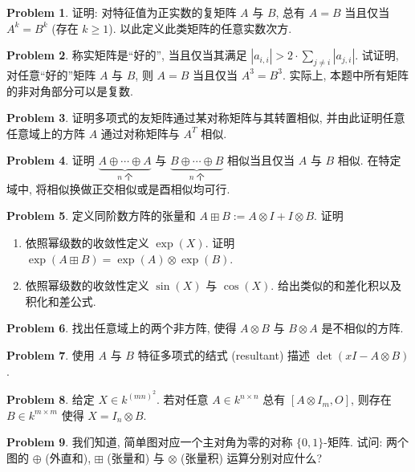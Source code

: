 \documentclass{MainStyle}
\theoremstyle{definition}
\newtheorem{problem}{Problem}
\begin{document}
\begin{problem}
证明: 对特征值为正实数的复矩阵 $A$ 与 $B$, 总有 $A=B$ 当且仅当 $A^k=B^k$ (存在 $k\geq 1$). 以此定义此类矩阵的任意实数次方.
\end{problem}

\begin{problem}
称实矩阵是``好的'', 当且仅当其满足 $|a_{i,i}|>2\cdot \sum_{j\neq i}|a_{j,i}|$. 试证明, 对任意``好的''矩阵 $A$ 与 $B$, 则 $A=B$ 当且仅当 $A^3=B^3$. 实际上, 本题中所有矩阵的非对角部分可以是复数.
\end{problem}

\begin{problem}
证明多项式的友矩阵通过某对称矩阵与其转置相似, 并由此证明任意任意域上的方阵 $A$ 通过对称矩阵与 $A^T$ 相似.
\end{problem}

\begin{problem}
证明 $\underset{n\text{ 个}}{\underbrace{A\oplus \cdots \oplus A}}$ 与 $\underset{n\text{ 个}}{\underbrace{B\oplus \cdots \oplus B}}$ 相似当且仅当 $A$ 与 $B$ 相似. 在特定域中, 将相似换做正交相似或是酉相似均可行.
\end{problem}

\begin{problem}
定义同阶数方阵的张量和 $A\boxplus B:=A\otimes I+I\otimes B$. 证明
\begin{enumerate}
    \item 依照幂级数的收敛性定义 $\exp(X)$. 证明 $\exp(A\boxplus B)=\exp(A)\otimes \exp(B)$.
    \item 依照幂级数的收敛性定义 $\sin(X)$ 与 $\cos(X)$. 给出类似的和差化积以及积化和差公式.
\end{enumerate}
\end{problem}

\begin{problem}
找出任意域上的两个非方阵, 使得 $A\otimes B$ 与 $B\otimes A$ 是不相似的方阵.
\end{problem}

\begin{problem}
使用 $A$ 与 $B$ 特征多项式的结式 (resultant) 描述 $\det (xI-A\otimes B)$.
\end{problem}

\begin{problem}
给定 $X\in k^{(mn)^2}$. 若对任意 $A\in k^{n\times n}$ 总有 $[A\otimes I_m,O]$, 则存在 $B\in k^{m\times m}$ 使得 $X=I_n\otimes B$.
\end{problem}

\begin{problem}
我们知道, 简单图对应一个主对角为零的对称 $\{0,1\}$-矩阵. 试问: 两个图的 $\oplus$ (外直和), $\boxplus$ (张量和) 与 $\otimes$ (张量积) 运算分别对应什么?
\end{problem}
\end{document}
